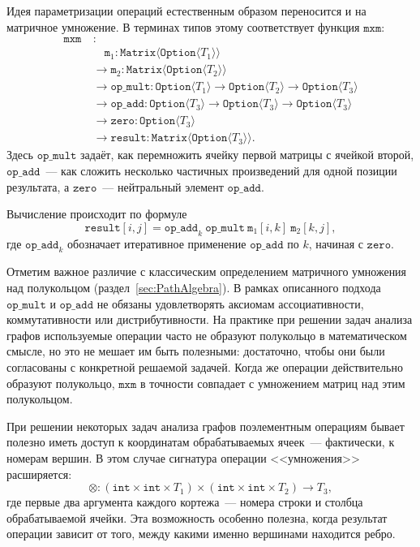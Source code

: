 Идея параметризации операций естественным образом переносится и на матричное умножение.
В терминах типов этому соответствует функция $\texttt{mxm}$:
\begin{align*}
    \texttt{mxm}\ & : \\
    & \quad \texttt{m}_1: \texttt{Matrix}\langle\texttt{Option}\langle T_1\rangle\rangle \\
    & \to \texttt{m}_2: \texttt{Matrix}\langle\texttt{Option}\langle T_2\rangle\rangle \\
    & \to \texttt{op\_mult}: \texttt{Option}\langle T_1\rangle \to \texttt{Option}\langle T_2\rangle \to \texttt{Option}\langle T_3\rangle \\
    & \to \texttt{op\_add}: \texttt{Option}\langle T_3\rangle \to \texttt{Option}\langle T_3\rangle \to \texttt{Option}\langle T_3\rangle \\
    & \to \texttt{zero}: \texttt{Option}\langle T_3\rangle \\
    & \to \texttt{result}: \texttt{Matrix}\langle\texttt{Option}\langle T_3\rangle\rangle.
\end{align*}
Здесь $\texttt{op\_mult}$ задаёт, как перемножить ячейку первой матрицы с ячейкой второй, $\texttt{op\_add}$~--- как сложить несколько частичных произведений для одной позиции результата, а $\texttt{zero}$~--- нейтральный элемент $\texttt{op\_add}$.

Вычисление происходит по формуле
\[
    \texttt{result}[i,j] = \texttt{op\_add}_{k}\ \texttt{op\_mult}\ \texttt{m}_1[i,k]\ \texttt{m}_2[k,j],
\]
где $\texttt{op\_add}_k$ обозначает итеративное применение $\texttt{op\_add}$ по $k$, начиная с $\texttt{zero}$.

Отметим важное различие с классическим определением матричного умножения над полукольцом (раздел~\ref{sec:PathAlgebra}).
В рамках описанного подхода $\texttt{op\_mult}$ и $\texttt{op\_add}$ не обязаны удовлетворять аксиомам ассоциативности, коммутативности или дистрибутивности.
На практике при решении задач анализа графов используемые операции часто не образуют полукольцо в математическом смысле, но это не мешает им быть полезными: достаточно, чтобы они были согласованы с конкретной решаемой задачей.
Когда же операции действительно образуют полукольцо, $\texttt{mxm}$ в точности совпадает с умножением матриц над этим полукольцом.

При решении некоторых задач анализа графов поэлементным операциям бывает полезно иметь доступ к координатам обрабатываемых ячеек~--- фактически, к номерам вершин.
В этом случае сигнатура операции <<умножения>> расширяется:
\[
    \otimes: (\texttt{int} \times \texttt{int} \times T_1) \times (\texttt{int} \times \texttt{int} \times T_2) \to T_3,
\]
где первые два аргумента каждого кортежа~--- номера строки и столбца обрабатываемой ячейки.
Эта возможность особенно полезна, когда результат операции зависит от того, между какими именно вершинами находится ребро.

